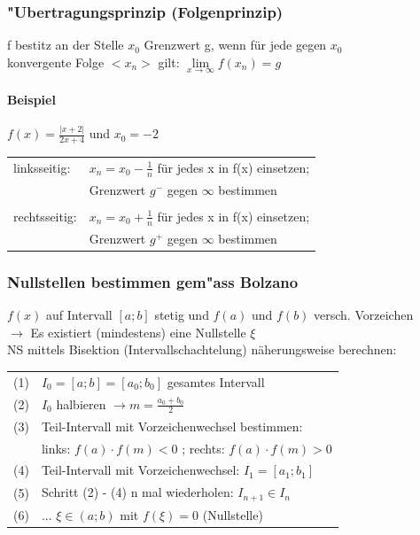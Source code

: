 			\subsubsection{"Ubertragungsprinzip (Folgenprinzip)}
			f bestitz an der Stelle $x_0$ Grenzwert g, wenn für jede gegen $x_0$\\
		    konvergente Folge $< x_n >$ gilt: $\lim\limits_{x \to \infty} f(x_n) = g$ 
		    
			\paragraph{Beispiel}
			$f(x) = \frac{\vert x + 2 \vert}{2x+4}$ und $x_0 = -2$ \\
			\begin{tabular}{ll}
			linksseitig: & $x_n = x_0 - \frac{1}{n}$ für jedes x in f(x) einsetzen; \\
			 & Grenzwert $g^-$ gegen $\infty$ bestimmen \\
			\\
			rechtsseitig: & $x_n = x_0 + \frac{1}{n}$ für jedes x in f(x) einsetzen; \\
			& Grenzwert $g^+$ gegen $\infty$ bestimmen \\
			\end{tabular}
			
			
			\subsubsection{Nullstellen bestimmen gem"ass Bolzano}
			$f(x)$ auf Intervall $[a;b]$ stetig und $f(a)$ und $f(b)$ versch. Vorzeichen \\
			$\rightarrow$ Es existiert (mindestens) eine 	Nullstelle $\xi$\\	
			NS mittels Bisektion (Intervallschachtelung) näherungsweise berechnen: \\
			
			\begin{tabular}{ll}
			(1) & $I_0 = [a ; b] = [a_0 ; b_0]$ gesamtes Intervall \\
			(2) & $I_0$ halbieren $\rightarrow m = \frac{a_0 + b_0}{2}$ \\
			(3) & Teil-Intervall mit Vorzeichenwechsel bestimmen: \\
			& links: $f(a) \cdot f(m) < 0$ ; rechts: $f(a) \cdot f(m) > 0$ \\
			(4)& Teil-Intervall mit Vorzeichenwechsel: $I_1 = [a_1 ; b_1]$ \\
			(5) & Schritt (2) - (4) n mal wiederholen: $I_{n+1} \in I_n$ \\
			(6) & ... $\xi \in (a;b)$ mit $f(\xi) = 0$ (Nullstelle) \\
			\end{tabular}						
			
